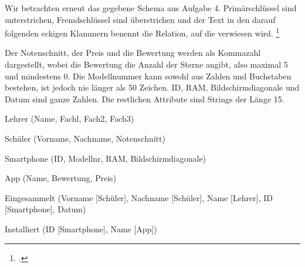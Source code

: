 \documentclass{lehramt-informatik-aufgabe}
\begin{document}

Wir betrachten erneut das gegebene Schema aus Aufgabe 4. Primärschlüssel
sind unterstrichen, Fremdschlüssel sind überstrichen und der Text in den
darauf folgenden eckigen Klammern benennt die Relation, auf die
verwiesen wird.
\footcite{examen:66116:2019:03}

Der Notenschnitt, der Preis und die Bewertung werden als Kommazahl
dargestellt, wobei die Bewertung die Anzahl der Sterne angibt, also
maximal 5 und mindestens 0. Die Modellnummer kann sowohl aus Zahlen und
Buchstaben bestehen, ist jedoch nie länger als 50 Zeichen. ID, RAM,
Bildschirmdiagonale und Datum sind ganze Zahlen. Die restlichen
Attribute sind Strings der Länge 15.

Lehrer (Name, Fachl, Fach2, Fach3)

Schüler (Vorname, Nachname, Notenschnitt)

Smartphone (ID, Modellnr, RAM, Bildschirmdiagonale)

App (Name, Bewertung, Preis)

Eingesammelt (Vorname [Schüler], Nachname [Schüler], Name [Lehrer], ID [Smartphone], Datum)

Installiert (ID [Smartphone], Name [App])
\end{document}
